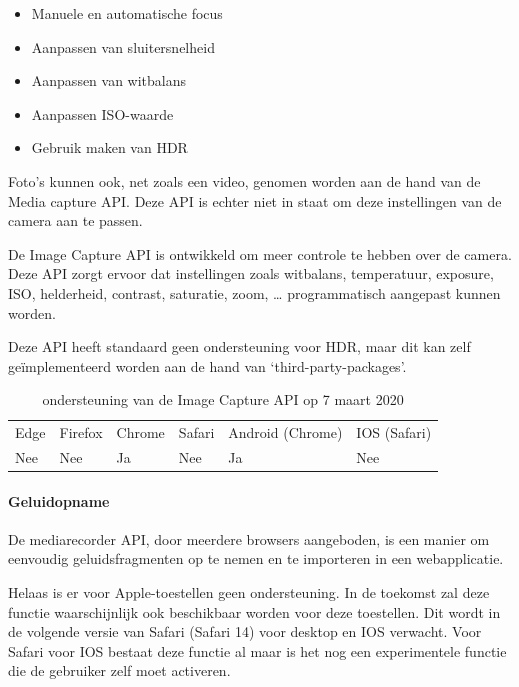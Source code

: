  \begin{itemize}
     \item Manuele en automatische focus
     \item Aanpassen van sluitersnelheid
     \item Aanpassen van witbalans
     \item Aanpassen ISO-waarde
     \item Gebruik maken van HDR 
   \end{itemize}

Foto's kunnen ook, net zoals een video, genomen worden aan de hand van de Media capture API. Deze API is echter niet in staat om deze instellingen van de camera aan te passen.

De Image Capture API \autocite{Mandyam2017} is ontwikkeld om meer controle te hebben over de camera. Deze API zorgt ervoor dat instellingen zoals witbalans, temperatuur, exposure, ISO, helderheid, contrast, saturatie, zoom, … programmatisch aangepast kunnen worden.

Deze API heeft standaard geen ondersteuning voor HDR, maar dit kan zelf geïmplementeerd worden aan de hand van ‘third-party-packages’.
\autocite{Bhaumik2019}

\begin{table}[H]
	\centering
	\begin{tabular}{llllll}
		Edge & Firefox & Chrome & Safari & Android (Chrome) & IOS (Safari) \\
		Nee   & Nee      & Ja     & Nee     & Ja               & Nee          
	\end{tabular}	
	\caption{ondersteuning van de Image Capture API op 7 maart 2020}
\end{table}



\paragraph{Geluidopname }



De mediarecorder API, \autocite{CasasSanchez2017} door meerdere browsers aangeboden, is een manier om eenvoudig geluidsfragmenten op te nemen en te importeren in een webapplicatie.

Helaas is er voor Apple-toestellen geen ondersteuning. In de toekomst zal deze functie waarschijnlijk ook beschikbaar worden voor deze toestellen. Dit wordt in de volgende versie van Safari (Safari 14) voor desktop en IOS verwacht. Voor Safari voor IOS bestaat deze functie al maar is het nog een experimentele functie die de gebruiker zelf moet activeren.



